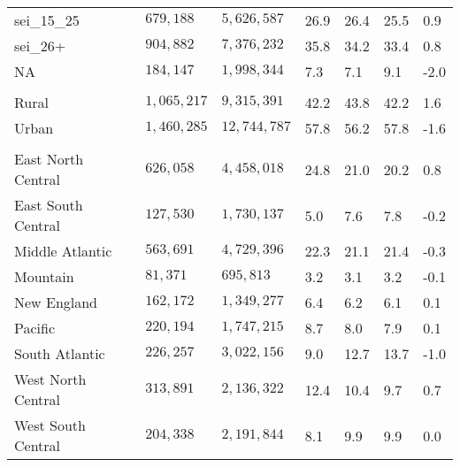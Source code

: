 \begin{longtable}{lllllll}
sei\_15\_25 & $679,188$ & $5,626,587$ & 26.9 & 26.4 & 25.5 & 0.9 \\ 
sei\_26+ & $904,882$ & $7,376,232$ & 35.8 & 34.2 & 33.4 & 0.8 \\ 
NA & $184,147$ & $1,998,344$ & 7.3 & 7.1 & 9.1 & -2.0 \\ 
\midrule\addlinespace[2.5pt]
\multicolumn{7}{l}{Rural} \\ 
\midrule\addlinespace[2.5pt]
Rural & $1,065,217$ & $9,315,391$ & 42.2 & 43.8 & 42.2 & 1.6 \\ 
Urban & $1,460,285$ & $12,744,787$ & 57.8 & 56.2 & 57.8 & -1.6 \\ 
\midrule\addlinespace[2.5pt]
\multicolumn{7}{l}{Region} \\ 
\midrule\addlinespace[2.5pt]
East North Central  & $626,058$ & $4,458,018$ & 24.8 & 21.0 & 20.2 & 0.8 \\ 
East South Central  & $127,530$ & $1,730,137$ & 5.0 & 7.6 & 7.8 & -0.2 \\ 
Middle Atlantic  & $563,691$ & $4,729,396$ & 22.3 & 21.1 & 21.4 & -0.3 \\ 
Mountain  & $81,371$ & $695,813$ & 3.2 & 3.1 & 3.2 & -0.1 \\ 
New England  & $162,172$ & $1,349,277$ & 6.4 & 6.2 & 6.1 & 0.1 \\ 
Pacific  & $220,194$ & $1,747,215$ & 8.7 & 8.0 & 7.9 & 0.1 \\ 
South Atlantic  & $226,257$ & $3,022,156$ & 9.0 & 12.7 & 13.7 & -1.0 \\ 
West North Central  & $313,891$ & $2,136,322$ & 12.4 & 10.4 & 9.7 & 0.7 \\ 
West South Central  & $204,338$ & $2,191,844$ & 8.1 & 9.9 & 9.9 & 0.0 \\ 
\bottomrule
\end{longtable}

